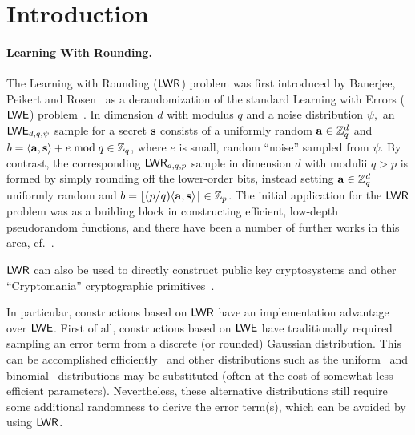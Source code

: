 \section{Introduction}
\label{sec:intro}


\paragraph{Learning With Rounding.} The Learning with Rounding ($\mathsf{LWR}$) problem was first introduced by
Banerjee, Peikert and Rosen~\cite{DBLP:conf/eurocrypt/BanerjeePR12} as
a derandomization of the standard Learning with Errors ($\mathsf{LWE}$)
problem~\cite{DBLP:journals/jacm/Regev09}. In dimension $d$ with
modulus $q$ and a noise distribution $\psi,$ an $\mathsf{LWE}_{d,q,\psi}$ sample for
a secret $\mathbf{s}$ consists of a uniformly random $\mathbf{a}\in\mathbb{Z}_q^d$ and
$b=\langle\mathbf{a},\mathbf{s}\rangle+e \bmod{q}\in\mathbb{Z}_q$, where $e$ is small, random ``noise'' sampled from $\psi$. By contrast, the corresponding $\mathsf{LWR}_{d,q,p}$ sample in dimension $d$
with modulii $q > p$ is formed by simply rounding off
the lower-order bits, instead setting $\mathbf{a}\in\mathbb{Z}_q^d$ uniformly random and $b=\lfloor(p/q)\langle\mathbf{a},\mathbf{s}\rangle\rceil\in\mathbb{Z}_p$.
 The initial
application for the $\mathsf{LWR}$ problem was as a building block in constructing
efficient, low-depth pseudorandom functions, and there have been a
number of further works in this
area, cf.~\cite{DBLP:conf/crypto/0001P14,DBLP:conf/tcc/0001FPPS15,DBLP:conf/crypto/BonehLMR13}.

$\mathsf{LWR}$ can also be used to directly construct public key cryptosystems and
other ``Cryptomania'' cryptographic
primitives~\cite{DBLP:conf/crypto/AlwenKPW13}. 

In particular, constructions based on $\mathsf{LWR}$ have an implementation
advantage over $\mathsf{LWE}$. First of all, constructions based on $\mathsf{LWE}$
have traditionally required sampling an error term from a discrete (or
rounded) Gaussian distribution. This can be accomplished
efficiently~\cite{DBLP:conf/stoc/GentryPV08,DBLP:conf/crypto/Peikert10}
and other distributions such as the
uniform~\cite{DBLP:conf/crypto/MicciancioP13} and
binomial~\cite{DBLP:conf/uss/AlkimDPS16} distributions may be
substituted (often at the cost of somewhat less efficient
parameters). Nevertheless, these alternative distributions still
require some additional randomness to derive the error term(s), which
can be avoided by using $\mathsf{LWR}$.

